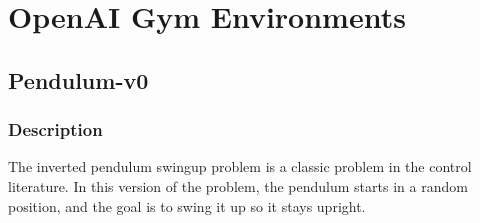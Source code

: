 \documentclass[a4paper, 11pt]{article}
\begin{document}
%		
%		
%		
	\section{OpenAI Gym Environments}
	\subsection{Pendulum-v0} 
	\subsubsection{Description}
	The inverted pendulum swingup problem is a classic problem in the control literature. In this version of the problem, the pendulum starts in a random position, and the goal is to swing it up so it stays upright.
\end{document}
